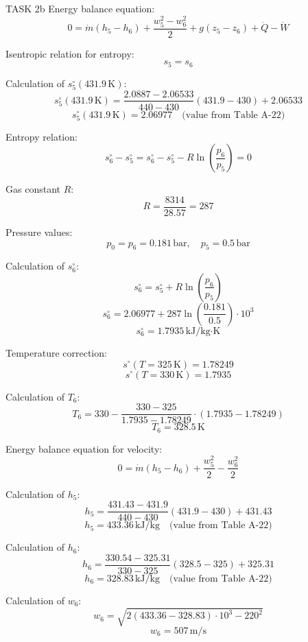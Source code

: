TASK 2b  
Energy balance equation:  
\[
0 = \dot{m} (h_5 - h_6) + \frac{w_5^2 - w_6^2}{2} + g(z_5 - z_6) + \dot{Q} - \dot{W}
\]  

Isentropic relation for entropy:  
\[
s_5 = s_6
\]  

Calculation of \( s_5^\circ(431.9 \, \text{K}) \):  
\[
s_5^\circ(431.9 \, \text{K}) = \frac{2.0887 - 2.06533}{440 - 430} (431.9 - 430) + 2.06533
\]  
\[
s_5^\circ(431.9 \, \text{K}) = 2.06977 \quad \text{(value from Table A-22)}
\]  

Entropy relation:  
\[
s_6^\circ - s_5^\circ = s_6^\circ - s_5^\circ - R \ln \left( \frac{p_6}{p_5} \right) = 0
\]  

Gas constant \( R \):  
\[
R = \frac{8314}{28.57} = 287
\]  

Pressure values:  
\[
p_0 = p_6 = 0.181 \, \text{bar}, \quad p_5 = 0.5 \, \text{bar}
\]  

Calculation of \( s_6^\circ \):  
\[
s_6^\circ = s_5^\circ + R \ln \left( \frac{p_6}{p_5} \right)
\]  
\[
s_6^\circ = 2.06977 + 287 \ln \left( \frac{0.181}{0.5} \right) \cdot 10^3
\]  
\[
s_6^\circ = 1.7935 \, \text{kJ/kg·K}
\]  

Temperature correction:  
\[
s^\circ(T = 325 \, \text{K}) = 1.78249
\]  
\[
s^\circ(T = 330 \, \text{K}) = 1.7935
\]  

Calculation of \( T_6 \):  
\[
T_6 = 330 - \frac{330 - 325}{1.7935 - 1.78249} \cdot (1.7935 - 1.78249)
\]  
\[
T_6 = 328.5 \, \text{K}
\]  

Energy balance equation for velocity:  
\[
0 = \dot{m} (h_5 - h_6) + \frac{w_5^2}{2} - \frac{w_6^2}{2}
\]  

Calculation of \( h_5 \):  
\[
h_5 = \frac{431.43 - 431.9}{440 - 430} (431.9 - 430) + 431.43
\]  
\[
h_5 = 433.36 \, \text{kJ/kg} \quad \text{(value from Table A-22)}
\]  

Calculation of \( h_6 \):  
\[
h_6 = \frac{330.54 - 325.31}{330 - 325} (328.5 - 325) + 325.31
\]  
\[
h_6 = 328.83 \, \text{kJ/kg} \quad \text{(value from Table A-22)}
\]  

Calculation of \( w_6 \):  
\[
w_6 = \sqrt{2 \left( 433.36 - 328.83 \right) \cdot 10^3 - 220^2}
\]  
\[
w_6 = 507 \, \text{m/s}
\]
